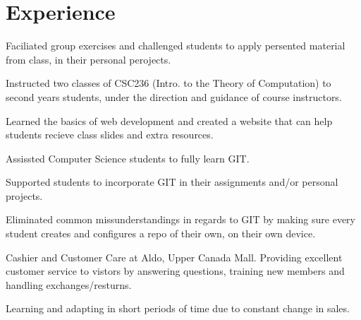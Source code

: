 \documentclass[]{dans-resume}
\begin{document}
\hfill
\begin{minipage}[t]{0.66\textwidth}

\section{Experience}

\vspace{\topsep} %
\begin{tightemize}
\item Faciliated group exercises and challenged students to apply persented material from class,
in their personal perojects.
\item Instructed two classes of CSC236 (Intro. to the Theory of
Computation) to second years students, under the direction and guidance of course instructors.
\item Learned the basics of web development and created a website that can help students
recieve class slides and extra resources.
\end{tightemize}

\begin{tightemize}
  \item Assissted Computer Science students to fully learn GIT.
  \item Supported students to incorporate GIT in their assignments
  and/or personal projects.
  \item Eliminated common missunderstandings in regards to GIT by making sure every student
  creates and configures a repo of their own, on their own device.
\end{tightemize}

\begin{tightemize}\item Cashier and Customer Care at Aldo, Upper Canada Mall.
  Providing excellent customer service to vistors by answering questions, training new members
  and handling exchanges/resturns.
  \item Learning and adapting in short periods of time due to constant change in sales.
\end{tightemize}


\end{minipage}
\end{document}
